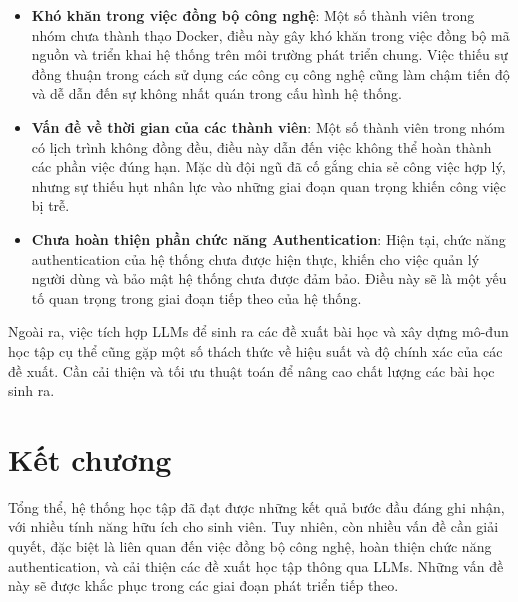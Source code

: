 \begin{itemize}
    \item \textbf{Khó khăn trong việc đồng bộ công nghệ}: Một số thành viên trong nhóm chưa thành thạo Docker, điều này gây khó khăn trong việc đồng bộ mã nguồn và triển khai hệ thống trên môi trường phát triển chung. Việc thiếu sự đồng thuận trong cách sử dụng các công cụ công nghệ cũng làm chậm tiến độ và dễ dẫn đến sự không nhất quán trong cấu hình hệ thống.
    \item \textbf{Vấn đề về thời gian của các thành viên}: Một số thành viên trong nhóm có lịch trình không đồng đều, điều này dẫn đến việc không thể hoàn thành các phần việc đúng hạn. Mặc dù đội ngũ đã cố gắng chia sẻ công việc hợp lý, nhưng sự thiếu hụt nhân lực vào những giai đoạn quan trọng khiến công việc bị trễ.
    \item \textbf{Chưa hoàn thiện phần chức năng Authentication}: Hiện tại, chức năng authentication của hệ thống chưa được hiện thực, khiến cho việc quản lý người dùng và bảo mật hệ thống chưa được đảm bảo. Điều này sẽ là một yếu tố quan trọng trong giai đoạn tiếp theo của hệ thống.
\end{itemize}

Ngoài ra, việc tích hợp LLMs để sinh ra các đề xuất bài học và xây dựng mô-đun học tập cụ thể cũng gặp một số thách thức về hiệu suất và độ chính xác của các đề xuất. Cần cải thiện và tối ưu thuật toán để nâng cao chất lượng các bài học sinh ra.

\section{Kết chương}

Tổng thể, hệ thống học tập đã đạt được những kết quả bước đầu đáng ghi nhận, với nhiều tính năng hữu ích cho sinh viên. Tuy nhiên, còn nhiều vấn đề cần giải quyết, đặc biệt là liên quan đến việc đồng bộ công nghệ, hoàn thiện chức năng authentication, và cải thiện các đề xuất học tập thông qua LLMs. Những vấn đề này sẽ được khắc phục trong các giai đoạn phát triển tiếp theo.

